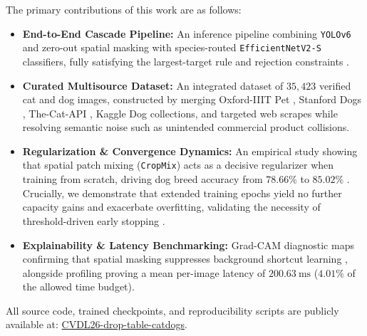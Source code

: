 The primary contributions of this work are as follows:
\begin{itemize}
    \item \textbf{End-to-End Cascade Pipeline:} An inference pipeline combining \texttt{YOLOv6} and zero-out spatial masking with species-routed \texttt{EfficientNetV2-S} classifiers, fully satisfying the largest-target rule and rejection constraints \cite{li2022yolov6, tan2021efficientnetv2}.
    \item \textbf{Curated Multisource Dataset:} An integrated dataset of $35,423$ verified cat and dog images, constructed by merging Oxford-IIIT Pet \cite{parkhi2012catsdogs}, Stanford Dogs \cite{khosla2011novel}, The-Cat-API \cite{cat_api}, Kaggle Dog collections, and targeted web scrapes \cite{unsplash, pixabay} while resolving semantic noise such as unintended commercial product collisions.
    \item \textbf{Regularization \& Convergence Dynamics:} An empirical study showing that spatial patch mixing (\texttt{CropMix}) acts as a decisive regularizer when training from scratch, driving dog breed accuracy from $78.66\%$ to $85.02\%$ \cite{yun2019cutmix}. Crucially, we demonstrate that extended training epochs yield no further capacity gains and exacerbate overfitting, validating the necessity of threshold-driven early stopping \cite{prechelt1998early}.
    \item \textbf{Explainability \& Latency Benchmarking:} Grad-CAM diagnostic maps confirming that spatial masking suppresses background shortcut learning \cite{selvaraju2017grad, geirhos2020shortcut}, alongside profiling proving a mean per-image latency of $200.63~\text{ms}$ ($4.01\%$ of the allowed time budget).
\end{itemize}

All source code, trained checkpoints, and reproducibility scripts are publicly available at: \href{https://github.com/NordlichtS/CVDL26-drop-table-catdogs}{CVDL26-drop-table-catdogs}.